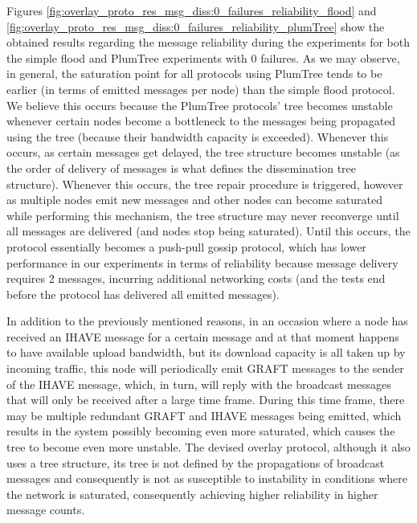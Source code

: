 Figures \ref{fig:overlay_proto_res_msg_diss:0_failures_reliability_flood} and \ref{fig:overlay_proto_res_msg_diss:0_failures_reliability_plumTree} show the obtained results regarding the message reliability during the experiments for both the simple flood and PlumTree experiments with 0 failures. As we may observe, in general, the saturation point for all protocols using PlumTree tends to be earlier (in terms of emitted messages per node) than the simple flood protocol. We believe this occurs because the PlumTree protocols' tree becomes unstable whenever certain nodes become a bottleneck to the messages being propagated using the tree (because their bandwidth capacity is exceeded). Whenever this occurs, as certain messages get delayed, the tree structure becomes unstable (as the order of delivery of messages is what defines the dissemination tree structure). Whenever this occurs, the tree repair procedure is triggered, however as multiple nodes emit new messages and other nodes can become saturated while performing this mechanism, the tree structure may never reconverge until all messages are delivered (and nodes stop being saturated). Until this occurs, the protocol essentially becomes a push-pull gossip protocol, which has lower performance in our experiments in terms of reliability because message delivery requires 2 messages, incurring additional networking costs (and the tests end before the protocol has delivered all emitted messages).

In addition to the previously mentioned reasons, in an occasion where a node has received an IHAVE message for a certain message and at that moment happens to have available upload bandwidth, but its download capacity is all taken up by incoming traffic, this node will periodically emit GRAFT messages to the sender of the IHAVE message, which, in turn, will reply with the broadcast messages that will only be received after a large time frame. During this time frame, there may be multiple redundant GRAFT and IHAVE messages being emitted, which results in the system possibly becoming even more saturated, which causes the tree to become even more unstable. The devised overlay protocol, although it also uses a tree structure, its tree is not defined by the propagations of broadcast messages and consequently is not as susceptible to instability in conditions where the network is saturated, consequently achieving higher reliability in higher message counts. 

